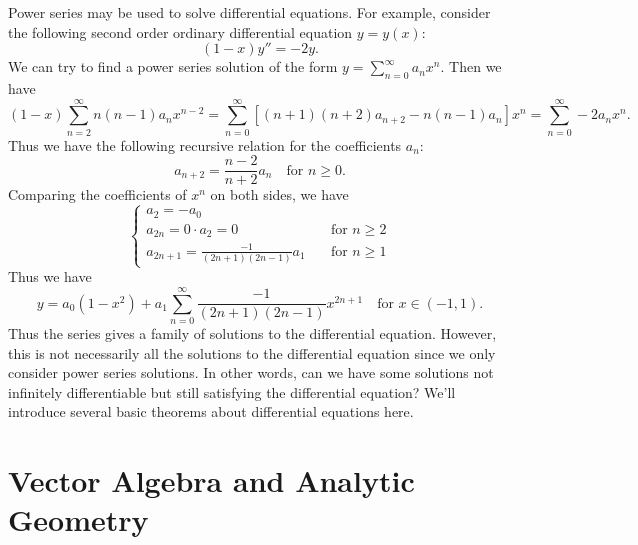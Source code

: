 \documentclass[a4paper]{ctexart}
\begin{document}
    \begin{myex}
        Power series may be used to solve differential equations. For example, consider the following second order ordinary differential equation $y=y(x)$:
        $$ (1-x) y'' = -2y.$$
        We can try to find a power series solution of the form $\displaystyle y = \sum_{n=0}^\infty a_n x^n$. Then we have
        \[
        (1-x) \sum_{n=2}^\infty n(n-1) a_n x^{n-2} = \sum_{n=0}^{\infty}\left[ (n+1)(n+2) a_{n+2} - n(n-1) a_n \right] x^n = \sum_{n=0}^\infty -2 a_n x^n.
        \]
        Thus we have the following recursive relation for the coefficients $a_n$:
        $$ a_{n+2} = \frac{n-2}{n+2} a_n \quad \text{for } n\ge 0. $$
        Comparing the coefficients of $x^n$ on both sides, we have 
        $$ \begin{cases}
            a_2 = -a_0 \\
            a_{2n} =  0 \cdot a_2 = 0 \quad &\text{for } n\ge 2 \\
            a_{2n+1} = \displaystyle \frac{-1}{(2n+1)(2n-1)} a_1 \quad &\text{for } n\ge 1
        \end{cases}
        $$
        Thus we have
        $$ y = a_0 (1-x^2) + a_1 \sum_{n=0}^\infty \frac{-1}{(2n+1)(2n-1)} x^{2n+1} \quad \text{for } x\in (-1,1). $$
        Thus the series gives a family of solutions to the differential equation. However, this is not necessarily all the solutions to the differential equation since we only consider power series solutions. In other words, can we have some solutions not infinitely differentiable but still satisfying the differential equation? We'll introduce several basic theorems about differential equations here.
    \end{myex}

    \newpage
    \section{Vector Algebra and Analytic Geometry}
\end{document}

